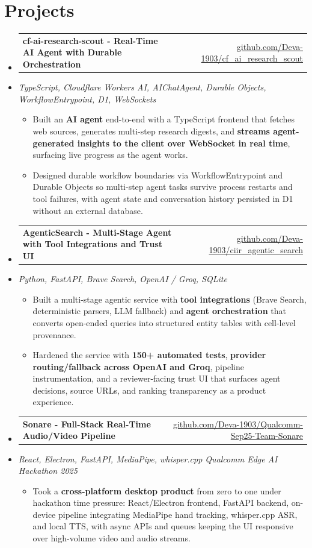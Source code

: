 \documentclass[letterpaper,10pt]{article}
\makeatletter
\newcommand{\resumeItem}[1]{
  \item\small{#1\vspace{-1pt}}
}
\newcommand{\resumeProjectHeading}[2]{
    \item
    \begin{tabular*}{0.985\textwidth}[t]{l@{\extracolsep{\fill}}r}
      \small\textbf{#1} & \small #2 \\
    \end{tabular*}\vspace{-5pt}
}
\newcommand{\resumeProjectSubheading}[1]{
  \vspace{-2pt}\item[] {\small\textcolor{ResumeSlate}{\emph{#1}}}\vspace{-3pt}
}
\newcommand{\resumeSubHeadingListStart}{\begin{itemize}[leftmargin=0.0in, label={}, itemsep=2pt, topsep=2pt]}
\newcommand{\resumeSubHeadingListEnd}{\end{itemize}}
\newcommand{\resumeItemListStart}{\begin{itemize}[leftmargin=0.18in, itemsep=2pt, topsep=1pt]}
\newcommand{\resumeItemListEnd}{\end{itemize}\vspace{-4pt}}
\makeatother
\begin{document}
\section{Projects}
\resumeSubHeadingListStart
  \resumeProjectHeading
    {cf-ai-research-scout - Real-Time AI Agent with Durable Orchestration}
    {\href{https://github.com/Deva-1903/cf_ai_research_scout}{github.com/Deva-1903/cf\_ai\_research\_scout}}
  \resumeProjectSubheading{TypeScript, Cloudflare Workers AI, AIChatAgent, Durable Objects, WorkflowEntrypoint, D1, WebSockets}
    \resumeItemListStart
      \resumeItem{Built an \textbf{AI agent} end-to-end with a TypeScript frontend that fetches web sources, generates multi-step research digests, and \textbf{streams agent-generated insights to the client over WebSocket in real time}, surfacing live progress as the agent works.}
      \resumeItem{Designed durable workflow boundaries via WorkflowEntrypoint and Durable Objects so multi-step agent tasks survive process restarts and tool failures, with agent state and conversation history persisted in D1 without an external database.}
    \resumeItemListEnd
  \resumeProjectHeading
    {AgenticSearch - Multi-Stage Agent with Tool Integrations and Trust UI}
    {\href{https://github.com/Deva-1903/ciir_agentic_search}{github.com/Deva-1903/ciir\_agentic\_search}}
  \resumeProjectSubheading{Python, FastAPI, Brave Search, OpenAI / Groq, SQLite}
    \resumeItemListStart
      \resumeItem{Built a multi-stage agentic service with \textbf{tool integrations} (Brave Search, deterministic parsers, LLM fallback) and \textbf{agent orchestration} that converts open-ended queries into structured entity tables with cell-level provenance.}
      \resumeItem{Hardened the service with \textbf{150+ automated tests}, \textbf{provider routing/fallback across OpenAI and Groq}, pipeline instrumentation, and a reviewer-facing trust UI that surfaces agent decisions, source URLs, and ranking transparency as a product experience.}
    \resumeItemListEnd
  \resumeProjectHeading
    {Sonare - Full-Stack Real-Time Audio/Video Pipeline}
    {\href{https://github.com/Deva-1903/Qualcomm-Sep25-Team-Sonare}{github.com/Deva-1903/Qualcomm-Sep25-Team-Sonare}}
  \resumeProjectSubheading{React, Electron, FastAPI, MediaPipe, whisper.cpp \enspace\textbar\enspace Qualcomm Edge AI Hackathon 2025}
    \resumeItemListStart
      \resumeItem{Took a \textbf{cross-platform desktop product} from zero to one under hackathon time pressure: React/Electron frontend, FastAPI backend, on-device pipeline integrating MediaPipe hand tracking, whisper.cpp ASR, and local TTS, with async APIs and queues keeping the UI responsive over high-volume video and audio streams.}
    \resumeItemListEnd
\resumeSubHeadingListEnd
\vspace{-4pt}
\end{document}
